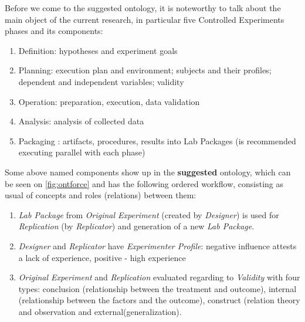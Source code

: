 	Before we come to the suggested ontology, it is noteworthy to talk about the main object of the current research, in particular five Controlled Experiments phases and its components\cite{Woh00}: 
	\begin{enumerate}
		\item Definition: hypotheses and experiment goals
		\item Planning: execution plan and environment; subjects and their profiles; dependent and independent variables; validity 
		\item Operation: preparation, execution, data validation
		\item Analysis: analysis of collected data
		\item Packaging : artifacts, procedures, results into Lab Packages (is recommended executing parallel with each phase)
	\end{enumerate}    
	Some above named components show up in the \textbf{suggested} ontology, which can be seen on \autoref{fig:ontforce} and has the following ordered workflow, consisting as usual of concepts and roles (relations) between them: 
	\begin{enumerate}
		\item \textit{Lab Package} from \textit{Original Experiment} (created by \textit{Designer}) is used for \textit{Replication} (by \textit{Replicator}) and generation of a new \textit{Lab Package}.
		\item \textit{Designer} and \textit{Replicator} have \textit{Experimenter Profile}: negative influence attests a lack of experience, positive - high experience
		\item \textit{Original Experiment} and \textit{Replication} evaluated regarding to \textit{Validity} with four types: conclusion (relationship between the treatment and outcome), internal (relationship between the factors and the outcome), construct (relation theory and observation and external(generalization).	
	\end{enumerate}

